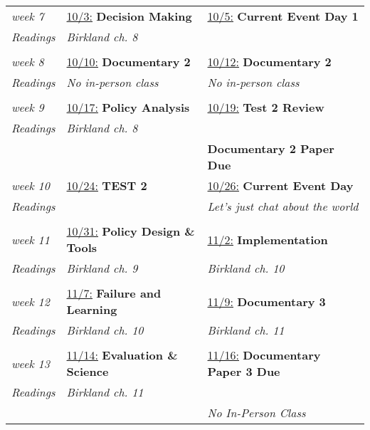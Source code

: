 \documentclass[12pt, letterpaper]{article}
\begin{document}
\begin{center}
\begin{longtable}{p{2cm} | p{6.8cm} | p{6.8cm}}
	\emph{week 7}	& \underline{10/3:} \textbf{Decision Making}			& \underline{10/5:} \textbf{Current Event Day 1}	\\
	\emph{Readings}	& \textit{Birkland ch. 8}								& 												 	\\
					& 														& 													\\ \hline	
	
	\emph{week 8}	& \underline{10/10:} \textbf{Documentary 2} 			& \underline{10/12:} \textbf{Documentary 2}			\\
	\emph{Readings}	& \textit{No in-person class}							& \textit{No in-person class}						\\
					& 														& 													\\ \hline	
	
	\emph{week 9}	& \underline{10/17:} \textbf{Policy Analysis}			& \underline{10/19:} \textbf\textbf{Test 2 Review}	\\
	\emph{Readings}	& \textit{Birkland ch. 8}								& 	  												\\
					& 														& \textbf{Documentary 2 Paper Due}					\\ \hline	
	
	\emph{week 10} 	& \underline{10/24:} \textbf{TEST 2}					& \underline{10/26:} \textbf{Current Event Day} 	\\
	\emph{Readings}	& 														& \textit{Let's just chat about the world}			\\ 
					&														&													\\\hline	
	
	\emph{week 11}  & \underline{10/31:} \textbf{Policy Design \& Tools}	& \underline{11/2:} \textbf{Implementation}			\\
	\emph{Readings}	& \textit{Birkland ch. 9}								& \textit{Birkland ch. 10}							\\
					& 														& 													\\ \hline	
	
	\emph{week 12} 	& \underline{11/7:} \textbf{Failure and Learning} 		& \underline{11/9:} \textbf{Documentary 3}			\\
	\emph{Readings}	& \textit{Birkland ch. 10}								& \textit{Birkland ch. 11}							\\
					&														& 													\\\hline	
		
	\emph{week 13} 	& \underline{11/14:} \textbf{Evaluation \& Science}		& \underline{11/16:} \textbf{Documentary Paper 3 Due}	\\
	\emph{Readings}	& \textit{Birkland ch. 11}								& 													\\
					& 														& \textit{No In-Person Class}						\\ \hline	
	

\end{longtable}
\end{center}
\end{document}
